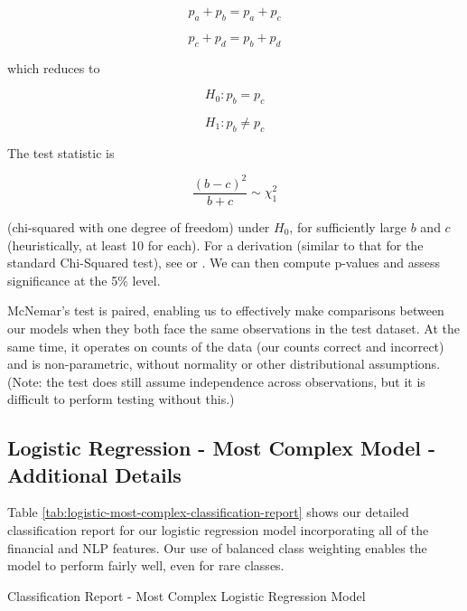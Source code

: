 \documentclass{article}[11pt]
\begin{document}
    \[
    p_{a}+p_{b}=p_{a}+p_{c}
    \]

    \[
    p_{c}+p_{d}=p_{b}+p_{d}
    \]

    which reduces to

    \[
    H_{0}:p_{b}=p_{c}
    \]

    \[
    H_{1}:p_{b}\neq p_{c}
    \]

    The test statistic is

    \[
    \frac{(b-c)^{2}}{b+c}\sim\chi_{1}^{2}
    \]

    (chi-squared with one degree of freedom) under $H_{0}$, for sufficiently large $b$ and $c$ (heuristically, at least 10 for each). For a derivation (similar to that for the standard Chi-Squared test), see \cite{mcnemar_note_1947} or \cite{rice_mathematical_2006}. We can then compute p-values and assess significance at the 5\% level.

    McNemar's test is paired, enabling us to effectively make comparisons between our models when they both face the same observations in the test dataset. At the same time, it operates on counts of the data (our counts correct and incorrect) and is non-parametric, without normality or other distributional assumptions. (Note: the test does still assume independence across observations, but it is difficult to perform testing without this.)

    \clearpage
    \newpage
    \subsection{Logistic Regression - Most Complex Model - Additional Details}

    \label{sec:logistic-most-complex-model-additional-details}

    Table \ref{tab:logistic-most-complex-classification-report} shows our detailed classification report for our logistic regression model incorporating all of the financial and NLP features. Our use of balanced class weighting enables the model to perform fairly well, even for rare classes.

    \begin{table}[h!]
        \centering
        \caption{Classification Report - Most Complex Logistic Regression Model}
        
        \label{tab:logistic-most-complex-classification-report}
    \end{table}
\end{document}

